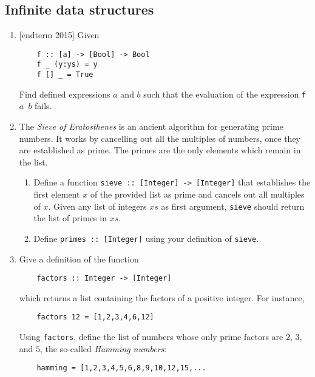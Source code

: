 \documentclass{article}
\def\code#1{\texttt{#1}}
\begin{document}
\subsection{Infinite data structures}
\begin{enumerate}
    \item {[endterm 2015]} Given
        \begin{verbatim}
    f :: [a] -> [Bool] -> Bool
    f _ (y:ys) = y
    f [] _ = True
        \end{verbatim}
        Find defined expressions $a$ and $b$ such that the evaluation of the expression \code{f $a$ $b$} fails.

    \item \cite[p. 443]{thompson} The \textit{Sieve of Eratosthenes} is an ancient algorithm for generating prime numbers. It works by cancelling out all the multiples of numbers, once they are established as prime. The primes are the only elements which remain in the list.
    \begin{enumerate}
        \item Define a function \code{sieve :: [Integer] -> [Integer]} that establishes the first element $x$ of the provided list as prime and cancels out all multiples of $x$. Given any list of integers $xs$ as first argument, \code{sieve} should return the list of primes in $xs$.
        \item Define \code{primes :: [Integer]} using your definition of \code{sieve}.
    \end{enumerate}

    \item \cite[p. 447]{thompson} Give a definition of the function
        \begin{verbatim}
    factors :: Integer -> [Integer]
        \end{verbatim}
        which returns a list containing the factors of a positive integer. For instance,
        \begin{verbatim}
    factors 12 = [1,2,3,4,6,12]
        \end{verbatim}
        Using \code{factors}, define the list of numbers whose only prime factors are $2$, $3$, and $5$, the so-called \textit{Hamming numbers}:
        \begin{verbatim}
    hamming = [1,2,3,4,5,6,8,9,10,12,15,...
        \end{verbatim}
\end{enumerate}

\printbibliography
\end{document}
